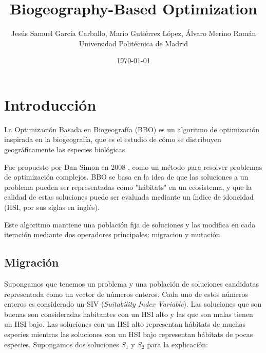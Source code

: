 \documentclass{article}
\begin{document}
\title{Biogeography-Based Optimization}

\author{{Jesús Samuel García Carballo,
Mario Gutiérrez López,
Álvaro Merino Román} \\
{\small Universidad Politécnica de Madrid}}
\date{\today}

\maketitle

\newpage

\section{Introducción}
\label{sec:meta1_intro}

La Optimización Basada en Biogeografía (BBO) es un algoritmo de optimización inspirada en la biogeografía, que es el estudio de cómo se distribuyen geográficamente las especies biológicas.

Fue propuesto por Dan Simon en 2008 \cite{simon2008biogeography}, como un método para resolver problemas de optimización complejos. 
BBO se basa en la idea de que las soluciones a un problema pueden ser representadas como "hábitats" en un ecosistema, y que la calidad de estas soluciones puede ser evaluada mediante un índice de idoneidad (HSI, por sus siglas en inglés).

Este algoritmo mantiene una población fija de soluciones y las modifica en cada iteración mediante dos operadores principales: migracion y mutación.

\subsection{Migración} \label{sec:migration}

Supongamos que tenemos un problema y una población de soluciones candidatas representada como un vector de números enteros. Cada uno de estos números enteros es considerado un SIV (\textit{Suitability Index Variable}).
Las soluciones que son buenas son consideradas habitantes con un HSI alto y las que son malas tienen un HSI bajo. Las soluciones con un HSI alto representan hábitats de muchas especies mientras las soluciones con un HSI bajo representan hábitats de pocas especies. Supongamos dos soluciones $S_1$ y $S_2$ para la explicación:
\end{document}
